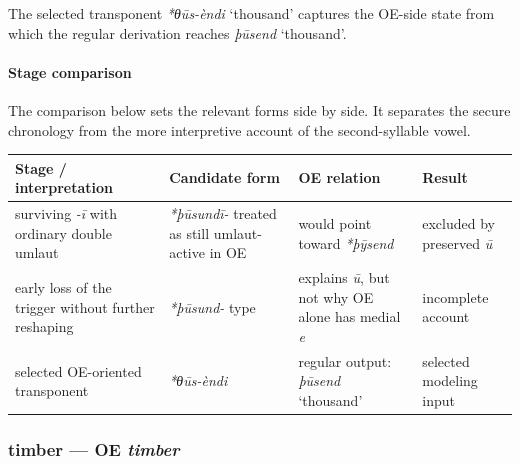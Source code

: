 \documentclass[
  british,
  a4paper,
]{article}
\newcounter{none} %
\providecommand{\Recon}[1]{\emph{*#1}}
\begin{document}
The selected transponent \Recon{θūs-èndi} `thousand' captures the
OE-side state from which the regular derivation reaches {\emph{þūsend}}
`thousand'.

\paragraph{Stage comparison}\label{stage-comparison-2}

The comparison below sets the relevant forms side by side. It separates
the secure chronology from the more interpretive account of the
second-syllable vowel.

{\def\LTcaptype{none} %
\begin{longtable}[]{@{}
  >{\raggedright\arraybackslash}p{}
  >{\raggedright\arraybackslash}p{}
  >{\raggedright\arraybackslash}p{}
  >{\raggedright\arraybackslash}p{}@{}}
\toprule\noalign{}
\begin{minipage}[b]{\linewidth}\raggedright
Stage / interpretation
\end{minipage} & \begin{minipage}[b]{\linewidth}\raggedright
Candidate form
\end{minipage} & \begin{minipage}[b]{\linewidth}\raggedright
OE relation
\end{minipage} & \begin{minipage}[b]{\linewidth}\raggedright
Result
\end{minipage} \\
\midrule\noalign{}
\endhead
\bottomrule\noalign{}
\endlastfoot
surviving \emph{-ī} with ordinary double umlaut & {\emph{*þūsundī-}}
treated as still umlaut-active in OE & would point toward
{\emph{*þȳsend}} & excluded by preserved \emph{ū} \\
early loss of the trigger without further reshaping & \emph{*þūsund-}
type & explains \emph{ū}, but not why OE alone has medial \emph{e} &
incomplete account \\
selected OE-oriented transponent & {\emph{*θūs-èndi}} & regular output:
{\emph{þūsend}} `thousand' & selected modeling input \\
\end{longtable}
}

\subsubsection{\texorpdfstring{timber --- OE
\emph{timber}}{timber --- OE timber}}\label{timber-oe-timber}
\end{document}

